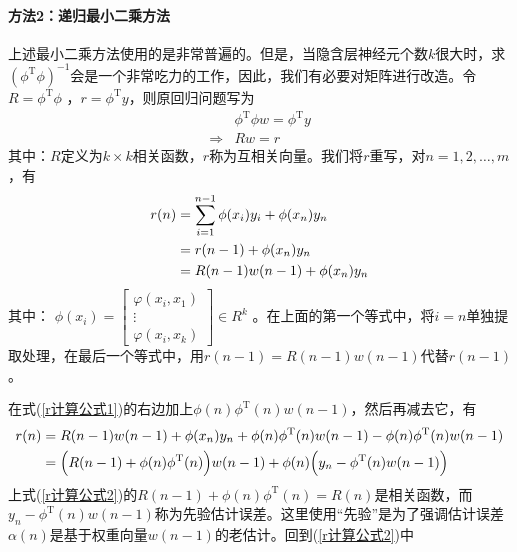             \paragraph{方法2：递归最小二乘方法}上述最小二乘方法使用的是非常普遍的。但是，当隐含层神经元个数$k$很大时，求$(\phi^\mathrm{T}\phi)^{-1}$会是一个非常吃力的工作，因此，我们有必要对矩阵进行改造。令$R = \phi^\mathrm{T}\phi$ ，$r= \phi^\mathrm{T}y$，则原回归问题写为
            \begin{align*}
            &\phi^\mathrm{T}\phi w = \phi^\mathrm{T}y \\
            \Rightarrow{} &Rw = r
            \end{align*}
            其中：$R$定义为$k\times k$相关函数，$r$称为互相关向量。我们将$r$重写，对$n = 1,2,\dots,m$，有
            \begin{align}
            \label{r计算公式1}
            r(n) & = \sum_{i=1}^{n-1} \phi(x_i)y_i + \phi(x_n)y_n\notag \\
            & =r(n-1)+\phi(x_n)y_n\notag\\
            & =R(n-1)w(n-1)+\phi(x_n)y_n
            \end{align}
            其中：
            \begin{math}
            \phi(x_i) =
            \left[
             \begin{smallmatrix}
            \varphi(x_i,x_1)\\
            \vdots\\
            \varphi(x_i,x_k)
            \end{smallmatrix}
             \right] \in R^k
            \end{math}
            。在上面的第一个等式中，将$i=n$单独提取处理，在最后一个等式中，用$r(n-1) = R(n-1)w(n-1)$代替$r(n-1)$。
            \par
            在式(\ref{r计算公式1})的右边加上$\phi(n)\phi^\mathrm{T}(n)w(n-1)$，然后再减去它，有
            \begin{align}
            \label{r计算公式2}
            r(n) & = R(n-1)w(n-1)+ \phi(x_n)y_n + \phi(n)\phi^\mathrm{T}(n)w(n-1) - \phi(n)\phi^\mathrm{T}(n)w(n-1)\notag\\
            & = \Bigl( R(n-1)+\phi(n)\phi^\mathrm{T}(n) \Bigr) w(n-1)+\phi(n) \Bigl( y_n-\phi^\mathrm{T}(n)w(n-1) \Bigr)
            \end{align}
            上式(\ref{r计算公式2})的$R(n-1)+\phi(n)\phi^\mathrm{T}(n) = R(n)$是相关函数，而$y_n-\phi^\mathrm{T}(n)w(n-1)$称为先验估计误差。这里使用“先验”是为了强调估计误差$\alpha(n)$是基于权重向量$w(n-1)$的老估计。回到(\ref{r计算公式2})中
